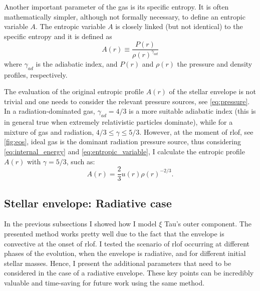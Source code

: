 Another important parameter of the gas is its specific entropy. It is often mathematically simpler, although not formally necessary, to define an entropic variable $A$. The entropic variable $A$ is closely linked (but not identical) to the specific entropy and it is defined as
\begin{equation}\label{eq:entropic_variable}
    A(r) \equiv \frac{P(r)}{\rho(r)^{\gamma_{ad}}}
\end{equation}
where $\gamma_{ad}$ is the adiabatic index, and $P(r)$ and $\rho(r)$ the pressure and density profiles, respectively. 

The evaluation of the original entropic profile $A(r)$ of the stellar envelope is not trivial and one needs to consider the relevant pressure sources, see \cref{eq:pressure}. In a radiation-dominated gas, $\gamma_{ad} = 4/3$ is a more suitable adiabatic index (this is in general true when extremely relativistic particles dominate), while for a mixture of gas and radiation, $4/3 \leq \gamma \leq 5/3$. However, at the moment of \ac{rlof}, see \cref{fig:eos}, ideal gas is the dominant radiation pressure source, thus considering \cref{eq:internal_energy} and \cref{eq:entropic_variable}, I calculate the entropic profile $A(r)$ with $\gamma = 5/3$, such as:
\begin{equation}\label{eq:entropic_variable_2}
    A(r) = \frac{2}{3} u(r) \rho(r)^{-2/3}.
\end{equation}

\subsection{Stellar envelope: Radiative case}\label{sub:envelope_rad}

In the previous subsections I showed how I model $\xi$ Tau's outer component. The presented method works pretty well due to the fact that the envelope is convective at the onset of \ac{rlof}. I tested the scenario of \ac{rlof} occurring at different phases of the evolution, when the envelope is radiative, and for different initial stellar masses. Hence, I present the additional parameters that need to be considered in the case of a radiative envelope. These key points can be incredibly valuable and time-saving for future work using the same method.

